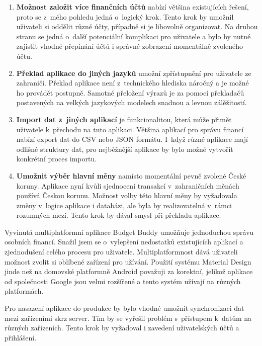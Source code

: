 \documentclass[
  biblatex,
  figures=true,
  tables=false,
  glossaries,
  index
]{kidiplom}
\begin{document}
\begin{enumerate}
  \item \textbf{Možnost založit více finančních účtů} nabízí většina existujících řešení, proto se z~mého pohledu jedná o~logický krok. Tento krok by umožnil uživateli si oddělit různé účty, případně si je libovolně organizovat. Na druhou stranu se jedná o~další potenciální komplikaci pro uživatele a bylo by nutné zajistit vhodné přepínání účtů i správné zobrazení momentálně zvoleného účtu.
  \item \textbf{Překlad aplikace do jiných jazyků} umožní zpřístupnění pro uživatele ze zahraničí. Překlad aplikace není z~technického hlediska náročný a je možné ho provádět postupně. Samotné přeložení výrazů je za pomocí překladačů postavených na velkých jazykových modelech snadnou a levnou zálěžitostí.
  \item \textbf{Import dat z~jiných aplikací} je funkcionalitou, která může přimět uživatele k~přechodu na tuto aplikaci. Většina aplikací pro správu financí nabízí export dat do CSV nebo JSON formátu. I~když různé aplikace mají odlišné struktury dat, pro nejběžnější aplikace by bylo možné vytvořit konkrétní proces importu.
  \item \textbf{Umožnit výběr hlavní měny} namísto momentální pevně zvolené České koruny. Aplikace nyní kvůli sjednocení transakcí v~zahraničních měnách používá Českou korunu. Možnost volby této hlavní měny by vyžadovala změny v~logice aplikace i databázi, ale byla by realizovatelná v~rámci rozumných mezí. Tento krok by dával smysl při překladu aplikace.
\end{enumerate}

\begin{kiconclusions}
Vyvinutá multiplatformní aplikace Budget Buddy umožňuje jednoduchou správu osobních financí. Snažil jsem se o~vylepšení nedostatků existujících aplikací a zjednodušení celého procesu pro uživatele. Multiplatformnost dává uživateli možnost zvolit si oblíbené zařízení pro užívání. Použití systému Material Design jinde než na domovské platformně Android považuji za korektní, jelikož aplikace od společnosti Google jsou velmi rozšířené a tento systém užívají na různých platformách.

Pro nasazení aplikace do produkce by bylo vhodné umožnit synchronizaci dat mezi zařízeními skrz server. Tím by se vyřešil problém s~přístupem k~datům na různých zařízeních. Tento krok by vyžadoval i zavedení uživatelských účtů a přihlášení.
\end{kiconclusions}
\end{document}
